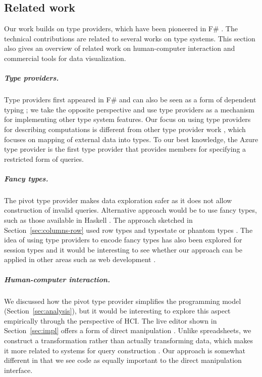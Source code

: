 \documentclass[a4paper,UKenglish]{lipics-v2016}
\theoremstyle{plain}
\theoremstyle{definition}
\begin{document}
\subsection{Related work}
\label{sec:further}

Our work builds on type providers, which have been pioneered in F\# \cite{inforich}.
The technical contributions are related to several works on type systems. This section
also gives an  overview of related work on human-computer interaction and commercial tools
for data visualization.

\subparagraph{Type providers.}
Type providers first appeared in F\# \cite{inforich} and can also be seen as a form of dependent 
typing \cite{idris-tp}; we take the opposite perspective and use type providers as a mechanism for 
implementing other type system features. Our focus on using type providers for describing 
computations is different from other type provider work \cite{fsdata,liteq,ageweb}, which focuses 
on mapping of external data into types. To our best knowledge, the Azure type provider \cite{azureprov} 
is the first type provider that provides members for specifying a restricted form of queries.

\subparagraph{Fancy types.}
The pivot type provider makes data exploration safer as it does not allow construction of invalid
queries. Alternative approach would be to use fancy types, such as those available in Haskell \cite{frames,fancytypes}. 
The approach sketched in Section~\ref{sec:columns-row} used row types and typestate or phantom types 
\cite{rowtypes,typestate,phanty}. The idea of using type providers to encode fancy types has also been
explored for session types \cite{sessionty,sessiontp} and it would be interesting to see whether
our approach can be applied in other areas such as web development \cite{urweb}.

\subparagraph{Human-computer interaction.}
We discussed how the pivot type provider simplifies the programming model (Section~\ref{sec:analysis}),
but it would be interesting to explore this aspect empirically through the perspective of HCI. 
The live editor shown in Section~\ref{sec:impl} offers a form of direct manipulation 
\cite{directman,directman2,dynamicq}. Unlike spreadsheets, we construct a transformation rather than
actually transforming data, which makes it more related to systems for query construction
\cite{spreadsheetalgebra,querydirect}. Our approach is somewhat different in that we see code 
as equally important to the direct manipulation interface.
\end{document}

